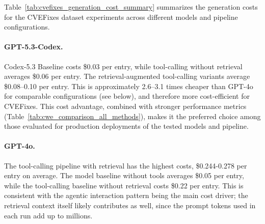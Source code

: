 Table~\ref{tab:cvefixes_generation_cost_summary} summarizes the generation costs for the CVEFixes dataset experiments across different models and pipeline configurations. 

\paragraph{GPT-5.3-Codex.} Codex-5.3 Baseline costs \$0.03 per entry, while tool-calling without retrieval averages \$0.06 per entry. 
The retrieval-augmented tool-calling variants average \$0.08--0.10 per entry. 
This is approximately 2.6–3.1 times cheaper than GPT-4o for comparable configurations (see below), and therefore more cost-efficient for CVEFixes. This cost advantage, combined with stronger performance metrics (Table~\ref{tab:cwe_comparison_all_methods}), makes it the preferred choice among those evaluated for production deployments of the tested models and pipeline.

\paragraph{GPT-4o.} The tool-calling pipeline with retrieval has the highest costs, \$0.244-0.278 per entry on average. The model baseline without tools averages \$0.05 per entry, while the tool-calling baseline without retrieval costs \$0.22 per entry. This is consistent with the agentic interaction pattern being the main cost driver; the retrieval context itself likely contributes as well, since the prompt tokens used in each run add up to millions.


